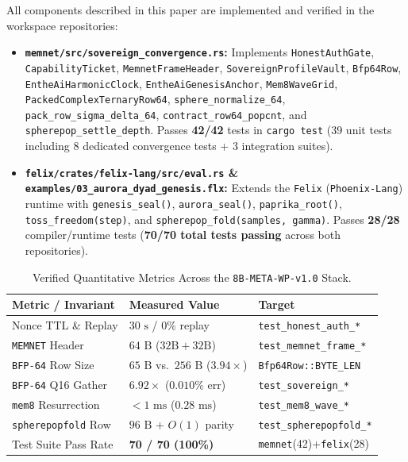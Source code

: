 \documentclass[10pt,twocolumn,letterpaper]{article}
\begin{document}
All components described in this paper are implemented and verified in the workspace repositories:
\begin{itemize}[leftmargin=1.4em,itemsep=1pt,topsep=2pt]
    \item \textbf{\texttt{memnet/src/sovereign\_convergence.rs}:} Implements \texttt{HonestAuthGate}, \texttt{CapabilityTicket}, \texttt{MemnetFrameHeader}, \texttt{SovereignProfileVault}, \texttt{Bfp64Row}, \texttt{EntheAiHarmonicClock}, \texttt{EntheAiGenesisAnchor}, \texttt{Mem8WaveGrid}, \texttt{PackedComplexTernaryRow64}, \texttt{sphere\_normalize\_64}, \texttt{pack\_row\_sigma\_delta\_64}, \texttt{contract\_row64\_popcnt}, and \texttt{spherepop\_settle\_depth}. Passes \textbf{42/42} tests in \texttt{cargo test} (39 unit tests including 8 dedicated convergence tests + 3 integration suites).
    \item \textbf{\texttt{felix/crates/felix-lang/src/eval.rs} \& \texttt{examples/03\_aurora\_dyad\_genesis.flx}:} Extends the \texttt{Felix} (\texttt{Phoenix-Lang}) runtime with \texttt{genesis\_seal()}, \texttt{aurora\_seal()}, \texttt{paprika\_root()}, \texttt{toss\_freedom(step)}, and \texttt{spherepop\_fold(samples, gamma)}. Passes \textbf{28/28} compiler/runtime tests (\textbf{70/70 total tests passing} across both repositories).
\end{itemize}

\begin{table}[ht]
\centering
\caption{Verified Quantitative Metrics Across the \texttt{8B-META-WP-v1.0} Stack.}
\label{tab:metrics}
\scriptsize
\renewcommand{\arraystretch}{1.12}
\begin{tabularx}{\columnwidth}{@{}lXl@{}}
\toprule
\textbf{Metric / Invariant} & \textbf{Measured Value} & \textbf{Target} \\
\midrule
Nonce TTL \& Replay & $30\text{ s}$ / $0\%$ replay & \texttt{test\_honest\_auth\_*} \\
\texttt{MEMNET} Header & $64\text{ B}$ ($32\text{B}+32\text{B}$) & \texttt{test\_memnet\_frame\_*} \\
\texttt{BFP-64} Row Size & $65\text{ B}$ vs.\ $256\text{ B}$ ($3.94\times$) & \texttt{Bfp64Row::BYTE\_LEN} \\
\texttt{BFP-64} Q16 Gather & $6.92\times$ ($0.010\%$ err) & \texttt{test\_sovereign\_*} \\
\texttt{mem8} Resurrection & $< 1\text{ ms}$ ($0.28\text{ ms}$) & \texttt{test\_mem8\_wave\_*} \\
\texttt{spherepopfold} Row & $96\text{ B}$ + $O(1)$ parity & \texttt{test\_spherepopfold\_*} \\
Test Suite Pass Rate & \textbf{70 / 70 (100\%)} & \texttt{memnet}(42)+\texttt{felix}(28) \\
\bottomrule
\end{tabularx}
\end{table}
\end{document}
